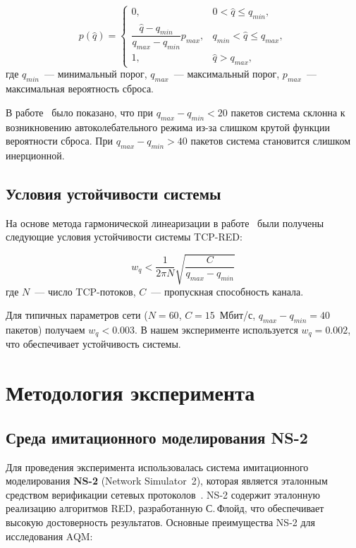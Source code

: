 \documentclass[%
]{ittmm}
\begin{document}
\begin{equation}
  p(\hat{q}) =
  \begin{cases}
    0, & 0 < \hat{q} \leq q_{min}, \\
    \dfrac{\hat{q} - q_{min}}{q_{max} - q_{min}} p_{max}, & q_{min} < \hat{q} \leq q_{max}, \\
    1, & \hat{q} > q_{max},
  \end{cases}
  \label{eq:red_prob}
\end{equation}
где $q_{min}$~--- минимальный порог, $q_{max}$~--- максимальный порог, $p_{max}$~--- максимальная вероятность сброса.

В работе~\cite{velieva2019phd} было показано, что при $q_{max} - q_{min} < 20$ пакетов система склонна к возникновению автоколебательного режима из-за слишком крутой функции вероятности сброса. При $q_{max} - q_{min} > 40$ пакетов система становится слишком инерционной.

\subsection{Условия устойчивости системы}

На основе метода гармонической линеаризации в работе~\cite{velieva2019phd} были получены следующие условия устойчивости системы TCP-RED:

\begin{equation}
  w_q < \frac{1}{2\pi N} \sqrt{\frac{C}{q_{max} - q_{min}}}
  \label{eq:stability}
\end{equation}
где $N$~--- число TCP-потоков, $C$~--- пропускная способность канала.

Для типичных параметров сети ($N=60$, $C=15$~Мбит/с, $q_{max}-q_{min}=40$ пакетов) получаем $w_q < 0.003$. В нашем эксперименте используется $w_q = 0.002$, что обеспечивает устойчивость системы.

\section{Методология эксперимента}

\subsection{Среда имитационного моделирования NS-2}

Для проведения эксперимента использовалась система имитационного моделирования \textbf{NS-2} (Network Simulator~2), которая является эталонным средством верификации сетевых протоколов~\cite{velieva2019phd}. NS-2 содержит эталонную реализацию алгоритмов RED, разработанную С.\,Флойд, что обеспечивает высокую достоверность результатов. Основные преимущества NS-2 для исследования AQM:
\end{document}
